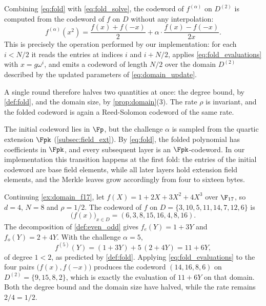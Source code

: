 Combining \cref{eq:fold} with \cref{eq:fold_solve}, the codeword of
$f^{(\alpha)}$ on $D^{(2)}$ is computed from the codeword of $f$ on $D$
without any interpolation:
%
\begin{equation}
\label{eq:fold_evaluations}
f^{(\alpha)}(x^2)
  = \frac{f(x) + f(-x)}{2}
  + \alpha \cdot \frac{f(x) - f(-x)}{2x} .
\end{equation}
%
This is precisely the operation performed by our implementation: for
each $i < N/2$ it reads the entries at indices $i$ and $i + N/2$,
applies \cref{eq:fold_evaluations} with $x = g\omega^{i}$, and emits a
codeword of length $N/2$ over the domain $D^{(2)}$ described by the
updated parameters of \cref{eq:domain_update}.
 
A single round therefore halves two quantities at once: the degree
bound, by \cref{def:fold}, and the domain size, by
\cref{prop:domain}(3). The rate $\rho$ is invariant, and the folded
codeword is again a Reed-Solomon codeword of the same rate.
 
\begin{remark}
\label{rem:ext_field_fold}
The initial codeword lies in $\Fp$, but the challenge $\alpha$ is
sampled from the quartic extension $\Fpk$
(\cref{subsec:field_ext}). By \cref{eq:fold}, the folded polynomial has
coefficients in $\Fpk$, and every subsequent layer is an
$\Fpk$-codeword. In our implementation this transition happens at the
first fold: the entries of the initial codeword are base field
elements, while all later layers hold extension field elements, and the
Merkle leaves grow accordingly from four to sixteen bytes.
\end{remark}
 
\begin{example}
\label{ex:fold_f17}
Continuing \cref{ex:domain_f17}, let
$f(X) = 1 + 2X + 3X^2 + 4X^3$ over $\F_{17}$, so $d = 4$, $N = 8$ and
$\rho = 1/2$. The codeword of $f$ on $D = \{3, 10, 5, 11, 14, 7, 12,
6\}$ is
%
\[
\bigl(f(x)\bigr)_{x \in D} = (6, 3, 8, 15, 16, 4, 8, 16).
\]
%
The decomposition of \cref{def:even_odd} gives $f_e(Y) = 1 + 3Y$ and
$f_o(Y) = 2 + 4Y$. With the challenge $\alpha = 5$,
%
\[
f^{(5)}(Y) = (1 + 3Y) + 5\,(2 + 4Y) = 11 + 6Y ,
\]
%
of degree $1 < 2$, as predicted by \cref{def:fold}. Applying
\cref{eq:fold_evaluations} to the four pairs
$\bigl(f(x), f(-x)\bigr)$ produces the codeword
$(14, 16, 8, 6)$ on $D^{(2)} = \{9, 15, 8, 2\}$, which is exactly the
evaluation of $11 + 6Y$ on that domain. Both the degree bound and the
domain size have halved, while the rate remains $2/4 = 1/2$.
\end{example}
 